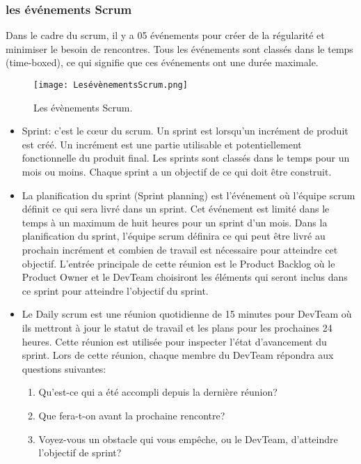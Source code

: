 \subsubsection{les événements Scrum}
Dans le cadre du scrum, il y a 05 événements pour créer de la régularité et minimiser le besoin de rencontres. Tous les événements sont classés dans le temps (time-boxed), ce qui signifie que ces événements ont une durée maximale.
\begin{figure}[ht]
	\centering
	\texttt{[image: LesévènementsScrum.png]}
	\caption{Les évènements Scrum.}
	\label{fig:Les évènements Scrum}
\end{figure}
\medskip
\begin{itemize}[label=$\square$,leftmargin=* ,parsep=0cm,itemsep=0cm,topsep=0cm]
	\item \textsf{Sprint:} c’est le cœur du scrum. Un sprint est lorsqu’un incrément de produit est créé. Un incrément est une partie utilisable et potentiellement fonctionnelle du produit final. Les sprints sont classés dans le temps pour un mois ou moins. Chaque sprint a un objectif de ce qui doit être construit. 
	\item \textsf{La planification du sprint (Sprint planning)} est l’événement où l’équipe scrum définit ce qui sera livré dans un sprint. Cet événement est limité dans le temps à un maximum de huit heures pour un sprint d’un mois. Dans la planification du sprint, l’équipe scrum définira ce qui peut être livré au prochain incrément et combien de travail est nécessaire pour atteindre cet objectif. L’entrée principale de cette réunion est le Product Backlog où le Product Owner et le DevTeam choisiront les éléments qui seront inclus dans ce sprint pour atteindre l’objectif du sprint. 
	\item \textsf{Le Daily scrum} est une réunion quotidienne de 15 minutes pour DevTeam où ils mettront à jour le statut de travail et les plans pour les prochaines 24 heures. Cette réunion est utilisée pour inspecter l’état d’avancement du sprint. Lors de cette réunion, chaque membre du DevTeam répondra aux questions suivantes:
	\begin{enumerate}
		\item Qu’est-ce qui a été accompli depuis la dernière réunion?
		\item Que fera-t-on avant la prochaine rencontre?
		\item Voyez-vous un obstacle qui vous empêche, ou le DevTeam, d’atteindre l’objectif de sprint?
	\end{enumerate}

\end{itemize}
